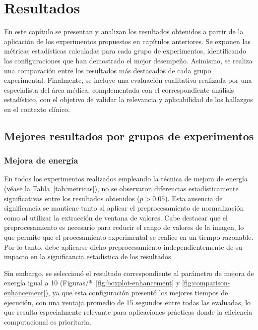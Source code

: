 \chapter{Resultados}\label{chapter:results}

En este capítulo se presentan y analizan los resultados obtenidos a partir de la aplicación de los experimentos propuestos en capítulos anteriores. Se exponen las métricas estadísticas calculadas para cada grupo de experimentos, identificando las configuraciones que han demostrado el mejor desempeño. Asimismo, se realiza una comparación entre los resultados más destacados de cada grupo experimental. Finalmente, se incluye una evaluación cualitativa realizada por una especialista del área médica, complementada con el correspondiente análisis estadístico, con el objetivo de validar la relevancia y aplicabilidad de los hallazgos en el contexto clínico.

\section{Mejores resultados por grupos de experimentos}

\subsection{Mejora de energía}

En todos los experimentos realizados empleando la técnica de mejora de energía (véase la Tabla~\ref{tab:metricas}), no se observaron diferencias estadísticamente significativas entre los resultados obtenidos ($p > 0.05$). Esta ausencia de significancia se mantiene tanto al aplicar el preprocesamiento de normalización como al utilizar la extracción de ventana de valores. Cabe destacar que el preprocesamiento es necesario para reducir el rango de valores de la imagen, lo que permite que el procesamiento experimental se realice en un tiempo razonable. Por lo tanto, debe aplicarse dicho preprocesamiento independientemente de su impacto en la significancia estadística de los resultados.

Sin embargo, se seleccionó el resultado correspondiente al parámetro de mejora de energía igual a 10 (Figuras/*~\ref{fig:boxplot-enhancement} y \ref{fig:comparison-enhancement}), ya que esta configuración presentó los mejores tiempos de ejecución, con una ventaja promedio de 15 segundos entre todas las evaluadas, lo que resulta especialmente relevante para aplicaciones prácticas donde la eficiencia computacional es prioritaria.

